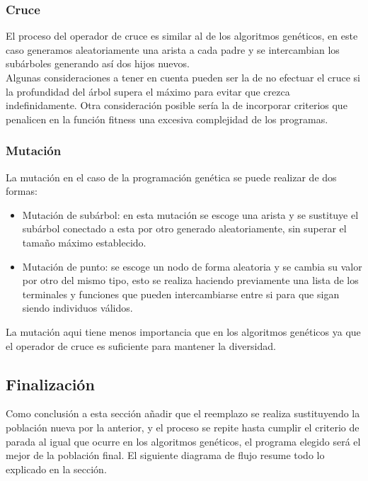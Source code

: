 \documentclass[12pt]{article} \usepackage[utf8x]{inputenc}
\begin{document}
\subsubsection{Cruce}
 
El proceso del operador de cruce es similar al de los algoritmos genéticos, 
en este caso generamos aleatoriamente una arista a cada padre y se 
intercambian los subárboles generando así dos hijos nuevos.\\

Algunas consideraciones a tener en cuenta pueden ser la de no efectuar
el cruce si la profundidad del árbol supera el máximo para evitar que
crezca indefinidamente. Otra consideración posible sería la de
incorporar criterios que penalicen en la función fitness una excesiva
complejidad de los programas.
 
\subsubsection{Mutación}
 
La mutación en el caso de la programación genética se puede realizar
de dos formas:
 
\begin{itemize}
\item Mutación de subárbol: en esta mutación se escoge una arista y se
  sustituye el subárbol conectado a esta por otro generado
  aleatoriamente, sin superar el tamaño máximo establecido.
\item Mutación de punto: se escoge un nodo de forma aleatoria y se
  cambia su valor por otro del mismo tipo, esto se realiza haciendo
  previamente una lista de los terminales y funciones que pueden
  intercambiarse entre si para que sigan siendo individuos válidos.
\end{itemize}

La mutación aqui tiene menos importancia que en los algoritmos
genéticos ya que el operador de cruce es suficiente para mantener la
diversidad.

\subsection{Finalización}

Como conclusión a esta sección añadir que el reemplazo se realiza
sustituyendo la población nueva por la anterior, y el proceso se
repite hasta cumplir el criterio de parada al igual que ocurre en los
algoritmos genéticos, el programa elegido será el mejor de la
población final. El siguiente diagrama de flujo resume todo lo
explicado en la sección.
  
\end{document}
